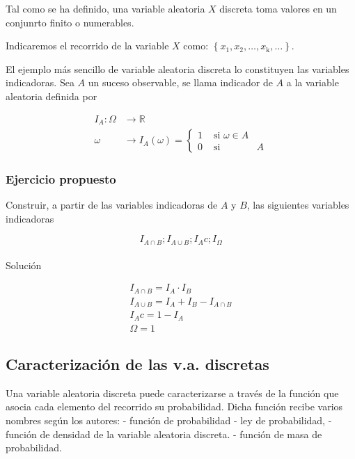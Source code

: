 \documentclass[
  a4paper,
  DIV=11,
  numbers=noendperiod]{scrreprt}
\makeatletter
\let\oldparagraph\paragraph
\renewcommand{\paragraph}{
    \@ifstar
      \xxxParagraphStar
      \xxxParagraphNoStar
  }
\newcommand{\xxxParagraphStar}[1]{\oldparagraph*{#1}\mbox{}}
\newcommand{\xxxParagraphNoStar}[1]{\oldparagraph{#1}\mbox{}}
\makeatother
\begin{document}
Tal como se ha definido, una variable aleatoria \(X\) discreta toma
valores en un conjunrto finito o numerables.

Indicaremos el recorrido de la variable \(X\) como:
\(\left\{x_{1}, x_{2}, \ldots, x_{\mathrm{k}}, \ldots\right\}\).

El ejemplo más sencillo de variable aleatoria discreta lo constituyen
las variables indicadoras. Sea \(A\) un suceso observable, se llama
indicador de \(A\) a la variable aleatoria definida por

\[
\begin{aligned}
I_{A}: \Omega & \rightarrow \mathbb{R} \\
\omega & \rightarrow I_{A}(\omega)=\left\{\begin{array}{lll}
1 & \text { si } \omega \in A \\
0 & \text { si } & A
\end{array}\right.
\end{aligned}
\]

\subsubsection{Ejercicio propuesto}\label{ejercicio-propuesto}

Construir, a partir de las variables indicadoras de \(A\) y \(B\), las
siguientes variables indicadoras

\[
I_{A \cap B} ; I_{A \cup B} ; I_{A} c ; I_{\Omega}
\]

\paragraph{Solución}\label{soluciuxf3n}

\[
\begin{gathered}
I_{A \cap B}=I_{A} \cdot I_{B} \\
I_{A \cup B}=I_{A}+I_{B}-I_{A \cap B} \\
I_{A} c=1-I_{A} \\
\Omega=1
\end{gathered}
\]

\subsection{Caracterización de las v.a.
discretas}\label{caracterizaciuxf3n-de-las-v.a.-discretas}

Una variable aleatoria discreta puede caracterizarse a través de la
función que asocia cada elemento del recorrido su probabilidad. Dicha
función recibe varios nombres según los autores: - función de
probabilidad - ley de probabilidad, - función de densidad de la variable
aleatoria discreta. - función de masa de probabilidad.
\end{document}
